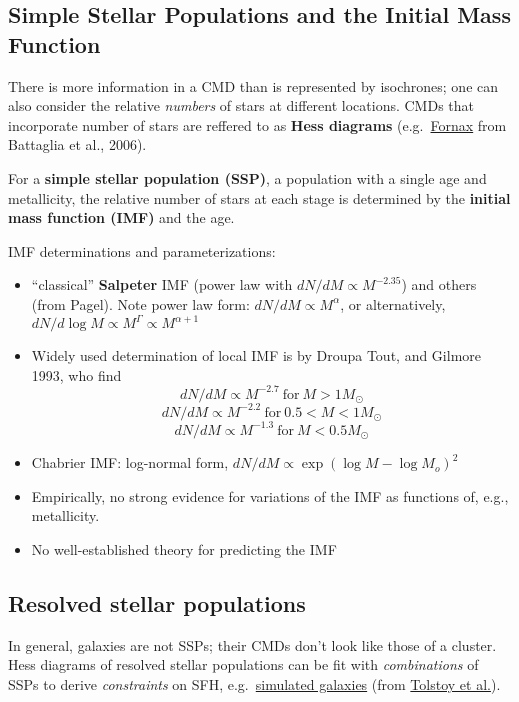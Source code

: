 \documentclass{article}
\begin{document}
\subsection{Simple Stellar Populations and the Initial Mass Function}
There is more information in a CMD than is represented by isochrones;
one can also consider the relative \textit{numbers} of stars at
different locations. CMDs that incorporate number of stars are
reffered to as \textbf{Hess diagrams} (e.g.\
\href{http://astronomy.nmsu.edu/holtz/a555/resources/fornaxhess.gif}
{Fornax} from Battaglia et al., 2006).

For a \textbf{simple stellar population (SSP)}, a population with a single age
and metallicity, the relative number of stars at each stage is
determined by the \textbf{initial mass function (IMF)} and the age.

IMF determinations and parameterizations:
\begin{itemize}
    \item ``classical'' \textbf{Salpeter} IMF (power law with
        $ dN/dM \propto M^{-2.35}$) and others
        (from {Pagel}). Note power law form:
        $ dN/dM \propto M^{\alpha}  $,
        or alternatively,
        $ dN/d\log{M} \propto M^{\Gamma} \propto M^{\alpha + 1} $
    \item Widely used determination of local IMF is by
        {Droupa Tout, and Gilmore 1993}, who find
        $$ dN/dM \propto M^{-2.7}\ \textrm{for}\ M > 1M_{\odot} $$
        $$ dN/dM \propto M^{-2.2}\ \textrm{for}\ 0.5 < M < 1M_{\odot} $$
        $$ dN/dM \propto M^{-1.3}\ \textrm{for}\ M < 0.5M_{\odot} $$
    \item Chabrier IMF: log-normal form,
        $ dN/dM \propto \exp(\log{M}-\log{M_o})^2  $
    \item Empirically, no strong evidence for variations of the
        IMF as functions of, e.g., metallicity.
    \item No well-established theory for predicting the IMF
\end{itemize}

\subsection{Resolved stellar populations}
In general, galaxies are not SSPs; their CMDs don't look like those of a
cluster. Hess diagrams of resolved stellar populations can be fit with
\emph{combinations} of SSPs to derive \emph{constraints} on SFH, e.g.\
\href{http://astronomy.nmsu.edu/holtz/a555/resources/modelpops.gif}
{simulated galaxies} (from \href{http://adsabs.harvard.edu/abs/2009ARA\%26A..47..371T}
{Tolstoy et al.}).
\end{document}
